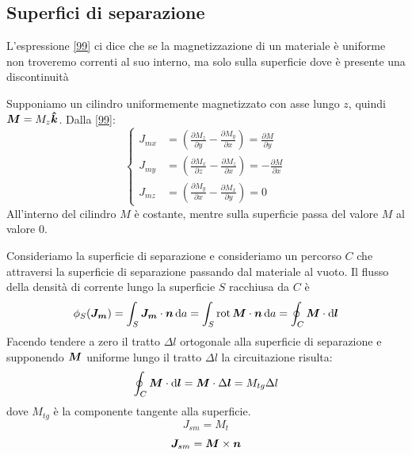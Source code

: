\subsection{Superfici di separazione}
L'espressione \eqref{99} ci dice che se la magnetizzazione di un materiale è uniforme non troveremo correnti al suo interno, ma solo sulla superficie dove è presente una discontinuità

Supponiamo un cilindro uniformemente magnetizzato con asse lungo $z$, quindi $\boldsymbol{M}=M_z\boldsymbol{\hat {k}}$. Dalla \eqref{99}:
\begin{equation}
  \left\{
  \begin{aligned}
    J_{mx} & =\left(\frac{\partial M_z}{\partial y}-\frac{\partial M_y}{\partial x}\right)=\frac{\partial M}{\partial y}  \\
    J_{my} & =\left(\frac{\partial M_x}{\partial z}-\frac{\partial M_z}{\partial x}\right)=-\frac{\partial M}{\partial x} \\
    J_{mz} & =\left(\frac{\partial M_y}{\partial x}-\frac{\partial M_x}{\partial y}\right)=0
  \end{aligned}
  \right.
\end{equation}
All'interno del cilindro $M$ è costante, mentre sulla superficie passa del valore $M$ al valore $0$.

Consideriamo la superficie di separazione e consideriamo un percorso $C$ che attraversi la superficie di separazione passando dal materiale al vuoto. Il flusso della densità di corrente lungo la superficie $S$ racchiusa da $C$ è
\begin{equation}
  \phi_S(\boldsymbol{J_m})=\int_S \boldsymbol{J_m}\cdot\boldsymbol{n}\,\mathrm{d} a=\int_S \operatorname{rot}\boldsymbol{M}\cdot\boldsymbol{n}\,\mathrm{d} a=\oint_C \boldsymbol{M}\cdot\mathrm{d}\boldsymbol{l}
\end{equation}
Facendo tendere a zero il tratto $\Delta l$ ortogonale alla superficie di separazione e supponendo $\boldsymbol{M}$ uniforme lungo il tratto $\Delta l$ la circuitazione risulta:
\begin{equation}
  \oint_C \boldsymbol{M}\cdot\mathrm{d}\boldsymbol{l}=\boldsymbol{M}\cdot \Delta \boldsymbol{l}=M_{tg}\Delta l
\end{equation}
dove $M_{tg}$ è la componente tangente alla superficie.
\begin{equation}
  J_{sm}=M_t
\end{equation}
\begin{equation}
  \boldsymbol{J}_{sm}=\boldsymbol{M}\times \boldsymbol{n}
  \label{correnti_superficiali}
\end{equation}

